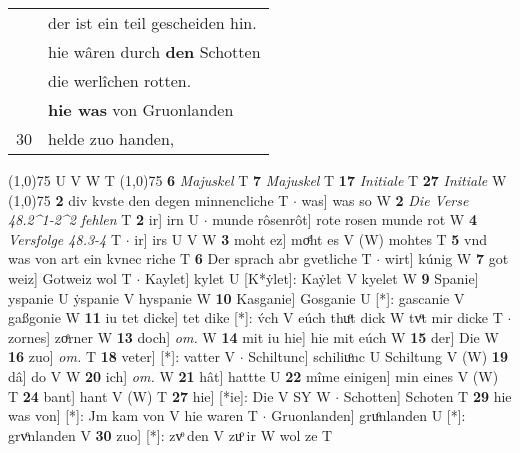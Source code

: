\documentclass[8pt,a4paper,notitlepage]{article}
\begin{document}
\begin{table}[ht]
\begin{minipage}[t]{0.5\linewidth}
\begin{tabular}{rl}
 & der ist ein teil gescheiden hin.\\ 
 & hie wâren durch \textbf{den} Schotten\\ 
 & die werlîchen rotten.\\ 
 & \textbf{hie was} von Gruonlanden\\ 
30 & helde zuo handen,\\ 
\end{tabular}
\scriptsize
\line(1,0){75} \newline
U V W T \newline
\line(1,0){75} \newline
\textbf{6} \textit{Majuskel} T  \textbf{7} \textit{Majuskel} T  \textbf{17} \textit{Initiale} T  \textbf{27} \textit{Initiale} W  \newline
\line(1,0){75} \newline
\textbf{2} div kvste den degen minnencliche T  $\cdot$ was] was so W \textbf{2} \textit{Die Verse 48.2\textasciicircum1-2\textasciicircum2 fehlen} T  \textbf{2} ir] irn U  $\cdot$ munde rôsenrôt] rote rosen munde rot W \textbf{4} \textit{Versfolge 48.3-4} T   $\cdot$ ir] irs U V W \textbf{3} moht ez] moͤht es V (W) mohtes T \textbf{5} vnd was von art ein kvnec riche T \textbf{6} Der sprach abr gvetliche T  $\cdot$ wirt] kúnig W \textbf{7} got weiz] Gotweiz wol T  $\cdot$ Kaylet] kylet U [K*ẏlet]: Kaẏlet V kyelet W \textbf{9} Spanie] yspanie U ẏspanie V hyspanie W \textbf{10} Kasganie] Gosganie U [*]: gascanie V gaßgonie W \textbf{11} iu tet dicke] tet dike [*]: v́ch V eúch thuͦt dick W tvͦt mir dicke T  $\cdot$ zornes] zoͤrner W \textbf{13} doch] \textit{om.} W \textbf{14} mit iu hie] hie mit eúch W \textbf{15} der] Die W \textbf{16} zuo] \textit{om.} T \textbf{18} veter] [*]: vatter V  $\cdot$ Schiltunc] schiliuͦnc U Schiltung V (W) \textbf{19} dâ] do V W \textbf{20} ich] \textit{om.} W \textbf{21} hât] hattte U \textbf{22} mîme einigen] min eines V (W) T \textbf{24} bant] hant V (W) T \textbf{27} hie] [*ie]: Die V SY W  $\cdot$ Schotten] Schoten T \textbf{29} hie was von] [*]: Jm kam von V hie waren T  $\cdot$ Gruonlanden] gruͦnlanden U [*]: grvͦnlanden V \textbf{30} zuo] [*]: zvͦ den V zuͦ ir W wol ze T \newline
\end{minipage}
\end{table}
\end{document}
